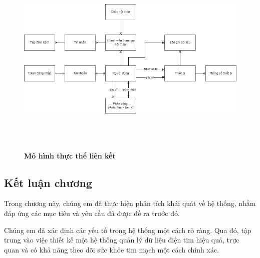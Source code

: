 \begin{figure}[H]
  \centering
  \includegraphics[width=15cm,height=9.5cm]{Images/system/fmECG_connection_entity.png}
  \caption[Mô hình thực thể liên kết]{\bfseries \fontsize{12pt}{0pt}
  \selectfont Mô hình thực thể liên kết}
  \label{ttlk} %
\end{figure}

\subsection{Kết luận chương}

Trong chương này, chúng em đã thực hiện phân tích khái quát về
 hệ thống, nhằm đáp ứng các mục tiêu và yêu cầu đã được đề ra trước đó.

Chúng em đã xác định các yếu tố trong hệ thống một cách rõ ràng.
 Qua đó, tập trung vào việc thiết kế một hệ thống quản lý dữ liệu điện tim hiệu quả,
  trực quan và có khả năng theo dõi sức khỏe tim mạch một cách
   chính xác. 


\newpage
